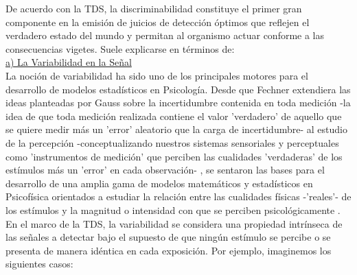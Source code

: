 De acuerdo con la TDS, la discriminabilidad constituye el primer gran componente en la emisión de juicios de detección óptimos que reflejen el verdadero estado del mundo y permitan al organismo actuar conforme a las consecuencias vigetes. Suele explicarse en términos de:\\ %

\underline{a) La Variabilidad en la Señal}\\

La noción de variabilidad ha sido uno de los principales motores para el desarrollo de modelos estadísticos en Psicología. Desde que Fechner extendiera las ideas planteadas por Gauss sobre la incertidumbre contenida en toda medición -la idea de que toda medición realizada contiene el valor 'verdadero' de aquello que se quiere medir más un 'error' aleatorio que la carga de incertidumbre- al estudio de la percepción -conceptualizando nuestros sistemas sensoriales y perceptuales como 'instrumentos de medición' que perciben las cualidades 'verdaderas' de los estímulos más un 'error' en cada observación- \parencite{Fechner, Gauss}, se sentaron las bases para el desarrollo de una amplia gama de modelos matemáticos y estadísticos en Psicofísica orientados a estudiar la relación entre las cualidades físicas -'reales'- de los estímulos y la magnitud o intensidad con que se perciben psicológicamente \parencite{Link1994}.\\

En el marco de la TDS, la variabilidad se considera una propiedad intrínseca de las señales a detectar bajo el supuesto de que ningún estímulo se percibe o se presenta de manera idéntica en cada exposición. Por ejemplo, imaginemos los siguientes casos: \\

